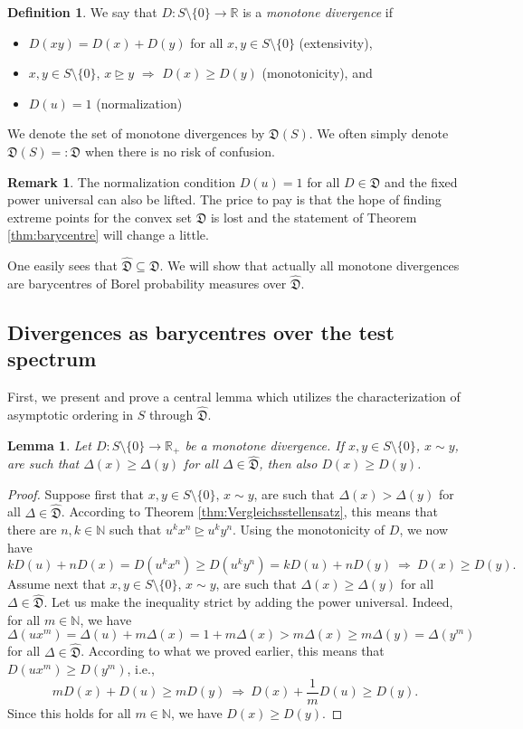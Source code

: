 \documentclass[12pt,a4paper,reqno]{amsart}
\newcommand{\rgeq}{\trianglerighteq}
\newtheorem{lemma}[proposition]{Lemma}
\theoremstyle{definition}
\newtheorem{definition}[proposition]{Definition}
\newtheorem{remark}[proposition]{Remark}
\newcommand{\mf}[1]{\mathfrak{#1}}
\newcommand{\N}{\mathbb N}
\newcommand{\R}{\mathbb R}
\begin{document}
\begin{definition}\label{def:mondiv}
We say that $D:S\setminus\{0\}\to\R$ is a {\it monotone divergence} if
\begin{itemize}
\item[(i)] $D(xy)=D(x)+D(y)$ for all $x,y\in S\setminus\{0\}$ (extensivity),
\item[(ii)] $x,y\in S\setminus\{0\}$, $x\rgeq y$ $\Rightarrow$ $D(x)\geq D(y)$ (monotonicity), and
\item[(iii)] $D(u)=1$ (normalization)
\end{itemize}
We denote the set of monotone divergences by $\mf D(S)$. We often simply denote $\mf D(S)=:\mf D$ when there is no risk of confusion.
\end{definition}

\begin{remark}
The normalization condition $D(u)=1$ for all $D\in\mf D$ and the fixed power universal can also be lifted. The price to pay is that the hope of finding extreme points for the convex set $\mf D$ is lost and the statement of Theorem \ref{thm:barycentre} will change a little.
\end{remark}

One easily sees that $\hat{\mf D}\subseteq\mf D$. We will show that actually all monotone divergences are barycentres of Borel probability measures over $\hat{\mf D}$.

\subsection{Divergences as barycentres over the test spectrum}\label{subsec:barycentres}

First, we present and prove a central lemma which utilizes the characterization of asymptotic ordering in $S$ through $\hat{\mf D}$.

\begin{lemma}\label{lemma:key}
Let $D:S\setminus\{0\}\to\R_+$ be a monotone divergence. If $x,y\in S\setminus\{0\}$, $x\sim y$, are such that $\Delta(x)\geq\Delta(y)$ for all $\Delta\in\hat{\mf D}$, then also $D(x)\geq D(y)$.
\end{lemma}

\begin{proof}
Suppose first that $x,y\in S\setminus\{0\}$, $x\sim y$, are such that $\Delta(x)>\Delta(y)$ for all $\Delta\in\hat{\mf D}$. According to Theorem \ref{thm:Vergleichsstellensatz}, this means that there are $n,k\in\N$ such that $u^k x^n\rgeq u^k y^n$. Using the monotonicity of $D$, we now have
$$
kD(u)+nD(x)=D(u^k x^n)\geq D(u^k y^n)=kD(u)+nD(y)\ \Rightarrow\ D(x)\geq D(y).
$$
Assume next that $x,y\in S\setminus\{0\}$, $x\sim y$, are such that $\Delta(x)\geq\Delta(y)$ for all $\Delta\in\hat{\mf D}$. Let us make the inequality strict by adding the power universal. Indeed, for all $m\in\N$, we have
$$
\Delta(ux^m)=\Delta(u)+m\Delta(x)=1+m\Delta(x)>m\Delta(x)\geq m\Delta(y)=\Delta(y^m)
$$
for all $\Delta\in\hat{\mf D}$. According to what we proved earlier, this means that $D(ux^m)\geq D(y^m)$, i.e.,
$$
mD(x)+D(u)\geq mD(y)\ \Rightarrow\ D(x)+\frac{1}{m}D(u)\geq D(y).
$$
Since this holds for all $m\in\N$, we have $D(x)\geq D(y)$.
\end{proof}
\end{document}
